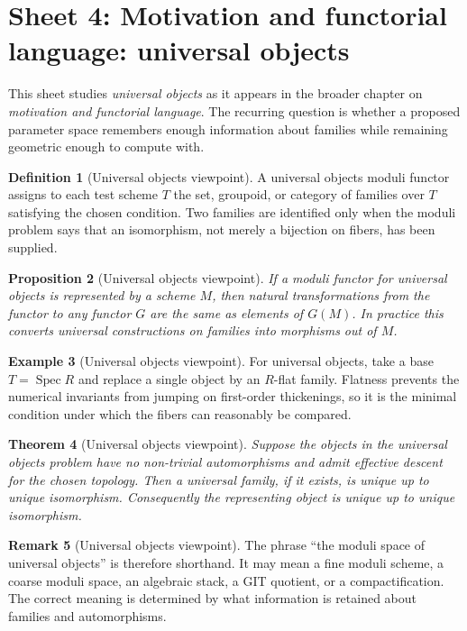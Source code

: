 \documentclass[11pt]{amsart}
\newtheorem{theorem}{Theorem}[section]
\newtheorem{proposition}[theorem]{Proposition}
\theoremstyle{definition}
\newtheorem{definition}[theorem]{Definition}
\newtheorem{example}[theorem]{Example}
\newtheorem{remark}[theorem]{Remark}
\newcommand{\Spec}{\operatorname{Spec}}
\begin{document}
\section{Sheet 4: Motivation and functorial language: universal objects}
This sheet studies \emph{universal objects} as it appears in the broader chapter on \emph{motivation and functorial language}.  The recurring question is whether a proposed parameter space remembers enough information about families while remaining geometric enough to compute with.
\begin{definition}[Universal objects viewpoint]
A universal objects moduli functor assigns to each test scheme $T$ the set, groupoid, or category of families over $T$ satisfying the chosen condition.  Two families are identified only when the moduli problem says that an isomorphism, not merely a bijection on fibers, has been supplied.
\end{definition}
\begin{proposition}[Universal objects viewpoint]
If a moduli functor for universal objects is represented by a scheme $M$, then natural transformations from the functor to any functor $G$ are the same as elements of $G(M)$.  In practice this converts universal constructions on families into morphisms out of $M$.
\end{proposition}
\begin{example}[Universal objects viewpoint]
For universal objects, take a base $T=\Spec R$ and replace a single object by an $R$-flat family.  Flatness prevents the numerical invariants from jumping on first-order thickenings, so it is the minimal condition under which the fibers can reasonably be compared.
\end{example}
\begin{theorem}[Universal objects viewpoint]
Suppose the objects in the universal objects problem have no non-trivial automorphisms and admit effective descent for the chosen topology.  Then a universal family, if it exists, is unique up to unique isomorphism.  Consequently the representing object is unique up to unique isomorphism.
\end{theorem}
\begin{remark}[Universal objects viewpoint]
The phrase ``the moduli space of universal objects'' is therefore shorthand.  It may mean a fine moduli scheme, a coarse moduli space, an algebraic stack, a GIT quotient, or a compactification.  The correct meaning is determined by what information is retained about families and automorphisms.
\end{remark}
\end{document}
